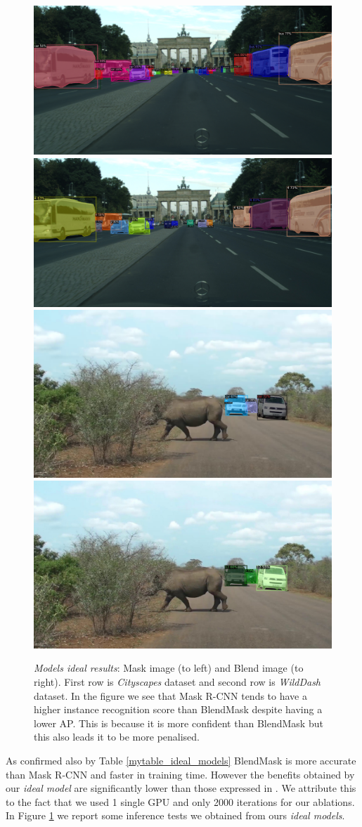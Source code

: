 \documentclass[10pt,twocolumn,letterpaper]{article}
\begin{document}
\begin{figure}[H]
\centering
 \includegraphics[width=0.45\linewidth]{./image/city_mask.png} \includegraphics[width=0.45\linewidth]{./image/city_blend.jpg} 
   \includegraphics[width=0.45\linewidth]{./image/wd_mask.png}  	\includegraphics[width=0.45\linewidth]{./image/wd_blend.jpg}   
  \caption{\textit{Models ideal results}: Mask image (to left) and Blend image (to right). First row is \textit{Cityscapes} dataset and second row is \textit{WildDash} dataset. In the figure we see that Mask R-CNN tends to have a higher instance recognition score than BlendMask despite having a lower AP. This is because it is more confident than BlendMask but this also leads it to be more penalised.}
  \label{fig:result_model_ideal}
\noindent
\end{figure}
As confirmed also by Table \ref{mytable_ideal_models} BlendMask is more accurate than Mask R-CNN and faster in training time. However the benefits obtained by our \textit{ideal model} are significantly lower than those expressed in \cite{Authors2_BlendMask}. We attribute this to the fact that we used 1 single GPU and only 2000 iterations for our ablations.
In Figure \ref{fig:result_model_ideal} we report some inference tests we obtained from ours \textit{ideal models}.
\end{document}

